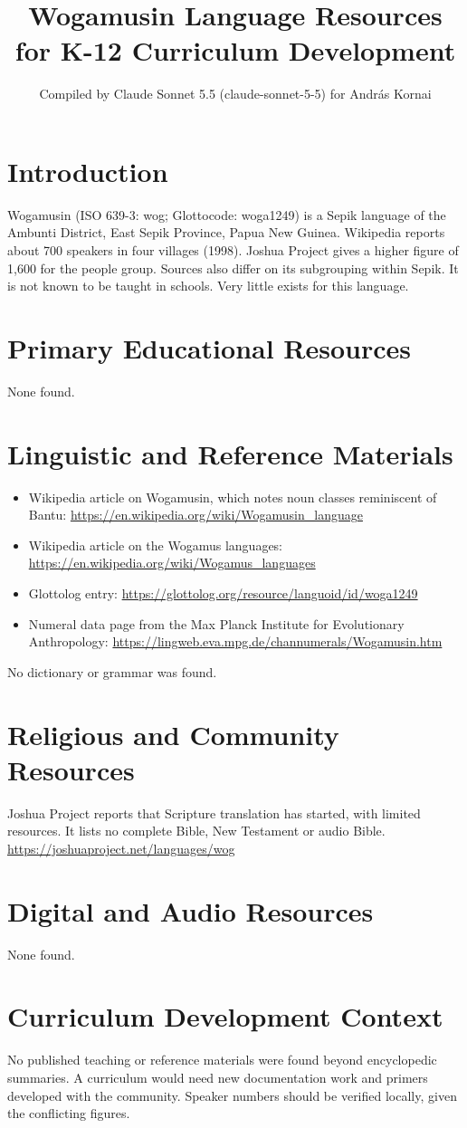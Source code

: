 \documentclass[12pt]{article}
\title{Wogamusin Language Resources for K-12 Curriculum Development}
\author{Compiled by Claude Sonnet 5.5 (claude-sonnet-5-5) for Andr\'as Kornai}
\date{}
\begin{document}
\maketitle

\section{Introduction}
Wogamusin (ISO 639-3: wog; Glottocode: woga1249) is a Sepik language of the Ambunti District, East Sepik Province, Papua New Guinea. Wikipedia reports about 700 speakers in four villages (1998). Joshua Project gives a higher figure of 1,600 for the people group. Sources also differ on its subgrouping within Sepik. It is not known to be taught in schools. Very little exists for this language.

\section{Primary Educational Resources}
None found.

\section{Linguistic and Reference Materials}
\begin{itemize}
\item Wikipedia article on Wogamusin, which notes noun classes reminiscent of Bantu: \url{https://en.wikipedia.org/wiki/Wogamusin_language}
\item Wikipedia article on the Wogamus languages: \url{https://en.wikipedia.org/wiki/Wogamus_languages}
\item Glottolog entry: \url{https://glottolog.org/resource/languoid/id/woga1249}
\item Numeral data page from the Max Planck Institute for Evolutionary Anthropology: \url{https://lingweb.eva.mpg.de/channumerals/Wogamusin.htm}
\end{itemize}
No dictionary or grammar was found.

\section{Religious and Community Resources}
Joshua Project reports that Scripture translation has started, with limited resources. It lists no complete Bible, New Testament or audio Bible. \url{https://joshuaproject.net/languages/wog}

\section{Digital and Audio Resources}
None found.

\section{Curriculum Development Context}
No published teaching or reference materials were found beyond encyclopedic summaries. A curriculum would need new documentation work and primers developed with the community. Speaker numbers should be verified locally, given the conflicting figures.
\end{document}
